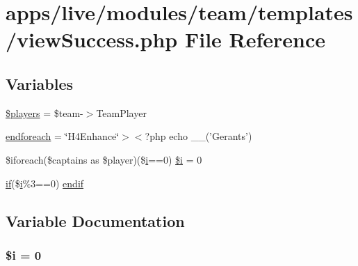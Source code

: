 \hypertarget{live_2modules_2team_2templates_2view_success_8php}{\section{apps/live/modules/team/templates/view\-Success.php File Reference}
\label{live_2modules_2team_2templates_2view_success_8php}
}
\subsection*{Variables}
\begin{DoxyCompactItemize}
\item 
\hyperlink{live_2modules_2team_2templates_2view_success_8php_a220718bf3fb2324837cf23ba63ef457f}{\$players} = \$team-\/$>$Team\-Player
\item 
\hyperlink{live_2modules_2team_2templates_2view_success_8php_a672d9707ef91db026c210f98cc601123}{endforeach} = \char`\"{}H4\-Enhance\char`\"{}$>$$<$?php echo \-\_\-\-\_\-('Gerants')
\item 
\$iforeach(\$captains as \$player)(\$\hyperlink{live_2modules_2partner_2templates_2__rolling_8php_a7e98b8a17c0aad30ba64d47b74e2a6c1}{i}==0) \hyperlink{live_2modules_2team_2templates_2view_success_8php_a83018d9153d17d91fbcf3bc10158d34f}{\$i} = 0
\item 
\hyperlink{live_2modules_2tournament_2templates_2__form_team_8php_ae30a307b320d8da5d9a945eaf68f7549}{if}(\$\hyperlink{live_2modules_2partner_2templates_2__rolling_8php_a7e98b8a17c0aad30ba64d47b74e2a6c1}{i}\%3==0) \hyperlink{live_2modules_2team_2templates_2view_success_8php_a82cd33ca97ff99f2fcc5e9c81d65251b}{endif}
\end{DoxyCompactItemize}


\subsection{Variable Documentation}
\hypertarget{live_2modules_2team_2templates_2view_success_8php_a83018d9153d17d91fbcf3bc10158d34f}{
\subsubsection[{\$i}]{\setlength{\rightskip}{0pt plus 5cm}\${\bf i} = 0}}\label{live_2modules_2team_2templates_2view_success_8php_a83018d9153d17d91fbcf3bc10158d34f}


